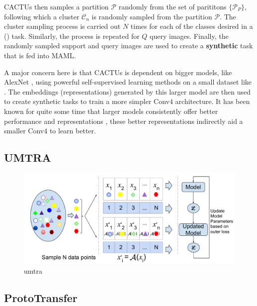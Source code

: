 CACTUs then samples a partition $\mathcal{P}$ randomly from the set of parititons $\{\mathcal{P}_P\}$, following which a cluster $\mathcal{C}_n$ is randomly sampled from the partition $\mathcal{P}$. The cluster sampling process is carried out $N$ times for each of the classes desired in a () task. Similarly, the process is repeated for $Q$ query images. Finally, the randomly sampled support and query images are used to create a \textbf{synthetic} task that is fed into MAML.

A major concern here is that CACTUs is dependent on bigger models, like AlexNet \parencite{AlexNet2012}, using powerful self-supervised learning methods on a small dataset like \miniImagenet{}. The embeddings (representations) generated by this larger model are then used to create synthetic tasks to train a more simpler Conv$4$ architecture. It has been known for quite some time that larger models consistently offer better performance and representations \parencite{Dosovitskiy2020, He2015}, these better representations indirectly aid a smaller Conv$4$ to learn better.

\subsection{UMTRA} \label{ssec:umtra}

\begin{figure}[ht]
    \centering
    \includegraphics[width=\linewidth]{chapters/assets/fsl/UnsupervisedMetaTraining3.pdf}
    \caption{umtra}
    \label{fig:umtra}
\end{figure}

\subsection{ProtoTransfer}\label{ssec:prototransfer}

